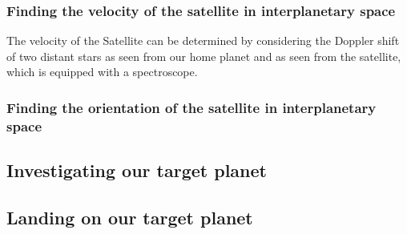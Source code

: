 \documentclass[a4paper,10pt,english]{article}
\begin{document}
\subsubsection{Finding the velocity of the satellite in interplanetary space}
The velocity of the Satellite can be determined by considering the Doppler shift of two distant stars as seen from our home planet and as seen from the satellite, which is equipped with a spectroscope.
\subsubsection{Finding the orientation of the satellite in interplanetary space}
\subsection{Investigating our target planet}
\subsection{Landing on our target planet}
\end{document}
